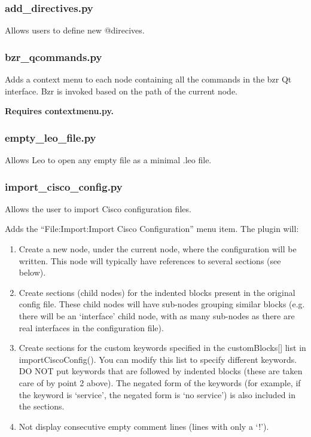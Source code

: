 \documentclass[a4paper,10pt,english]{sphinxmanual}
\begin{document}
\subsubsection{add\_directives.py}
\label{plugins:add-directives-py}
Allows users to define new @direcives.


\subsubsection{bzr\_qcommands.py}
\label{plugins:bzr-qcommands-py}
Adds a context menu to each node containing all the commands in the bzr Qt
interface. Bzr is invoked based on the path of the current node.

\textbf{Requires contextmenu.py.}


\subsubsection{empty\_leo\_file.py}
\label{plugins:empty-leo-file-py}
Allows Leo to open any empty file as a minimal .leo file.


\subsubsection{import\_cisco\_config.py}
\label{plugins:import-cisco-config-py}
Allows the user to import Cisco configuration files.

Adds the ``File:Import:Import Cisco Configuration'' menu item. The plugin will:
\begin{enumerate}
\item {} 
Create a new node, under the current node, where the configuration will be
written. This node will typically have references to several sections (see below).

\item {} 
Create sections (child nodes) for the indented blocks present in the original
config file. These child nodes will have sub-nodes grouping similar blocks (e.g.
there will be an `interface' child node, with as many sub-nodes as there are real
interfaces in the configuration file).

\item {} 
Create sections for the custom keywords specified in the customBlocks{[}{]} list in
importCiscoConfig(). You can modify this list to specify different keywords. DO
NOT put keywords that are followed by indented blocks (these are taken care of by
point 2 above). The negated form of the keywords (for example, if the keyword is
`service', the negated form is `no service') is also included in the sections.

\item {} 
Not display consecutive empty comment lines (lines with only a `!').

\end{enumerate}
\end{document}
